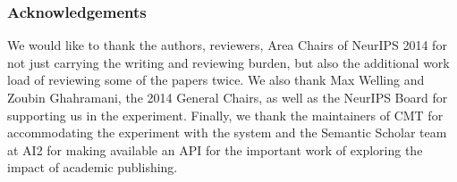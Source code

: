 \documentclass[twoside]{article}
\begin{document}
\subsubsection*{Acknowledgements}

We would like to thank the authors, reviewers, Area Chairs of NeurIPS 2014 for not just carrying the writing and reviewing burden, but also the additional work load of reviewing some of the papers twice. We also thank Max Welling and Zoubin Ghahramani, the 2014 General Chairs, as well as the NeurIPS Board for supporting us in the experiment. Finally, we thank the maintainers of CMT for accommodating the experiment with the system and the Semantic Scholar team at AI2 for making available an API for the important work of exploring the impact of academic publishing.



\appendix

\end{document}
